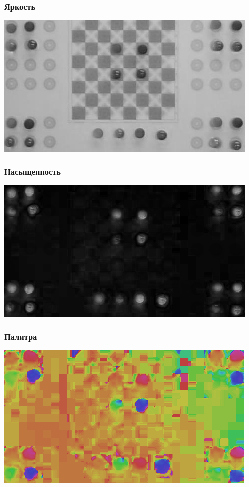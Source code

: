 \documentclass[24pt,pdf,hyperref={unicode},aspectratio=169]{beamer}
\begin{document}
\begin{frame}\frametitle{Яркость}
\includegraphics[width=\textwidth]{Images/Checkers-light.png} 
\end{frame}

\begin{frame}\frametitle{Насыщенность}
\includegraphics[width=\textwidth]{Images/Checkers-sat.png} 
\end{frame}

\begin{frame}\frametitle{Палитра}
\includegraphics[width=\textwidth]{Images/Checkers-hue.png} 
\end{frame}
\end{document}
